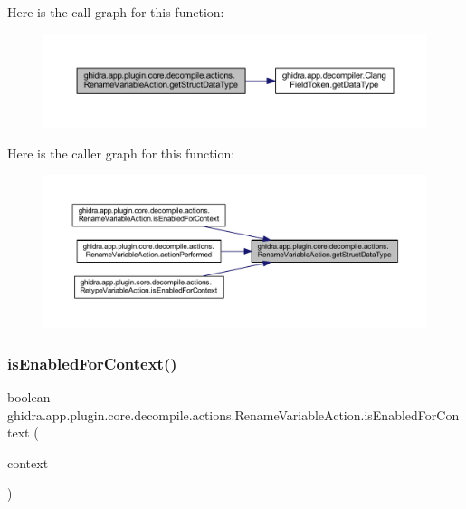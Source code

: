 Here is the call graph for this function\+:
\nopagebreak
\begin{figure}[H]
\begin{center}
\leavevmode
\includegraphics[width=350pt]{classghidra_1_1app_1_1plugin_1_1core_1_1decompile_1_1actions_1_1_rename_variable_action_aae5f9e84106ddcf6bd573595dd9b219f_cgraph}
\end{center}
\end{figure}
Here is the caller graph for this function\+:
\nopagebreak
\begin{figure}[H]
\begin{center}
\leavevmode
\includegraphics[width=350pt]{classghidra_1_1app_1_1plugin_1_1core_1_1decompile_1_1actions_1_1_rename_variable_action_aae5f9e84106ddcf6bd573595dd9b219f_icgraph}
\end{center}
\end{figure}
\mbox{\label{classghidra_1_1app_1_1plugin_1_1core_1_1decompile_1_1actions_1_1_rename_variable_action_a823658f79732c41f5c7e6951d95df83b}} 
\subsubsection{\texorpdfstring{isEnabledForContext()}{isEnabledForContext()}}
{\footnotesize\ttfamily boolean ghidra.\+app.\+plugin.\+core.\+decompile.\+actions.\+Rename\+Variable\+Action.\+is\+Enabled\+For\+Context (\begin{DoxyParamCaption}\item[{Action\+Context}]{context }\end{DoxyParamCaption})\hspace{0.3cm}{\ttfamily [inline]}}



